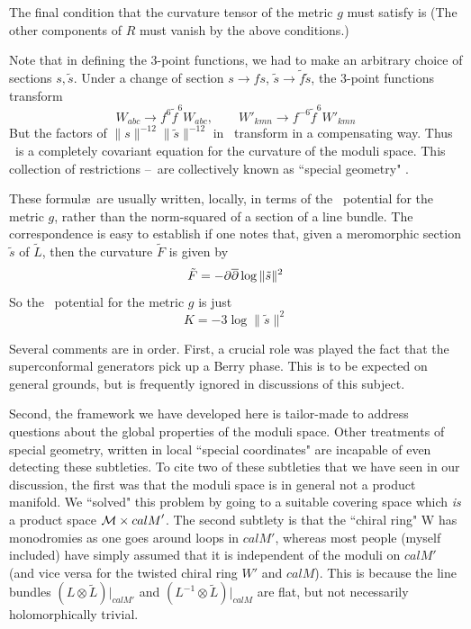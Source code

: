 The final condition that the curvature tensor of the metric $g$ must satisfy is
\eqn{}
(The other components of $R$ must vanish by the above conditions.)

Note that in defining the 3-point functions, we had to make an arbitrary choice
of sections $s,\tilde s$. Under a change of section $s\to f s$, $\tilde s\to
\tilde f\tilde s$, the 3-point functions  transform
$$W_{abc}\to f^6\tilde f^6 W_{abc},\qquad W'_{kmn}\to f^{-6}\tilde
f^6W'_{kmn}$$
But the factors of $\|s\|^{-12}\|\tilde s\|^{-12}$ in \Rspec\ transform in a
compensating way.
Thus  \Rspec\ is a completely covariant equation for the curvature
of the moduli space.  This collection of restrictions \Fspeca--\Rspec{}\ are
collectively known as ``special geometry"
.

These formul\ae\ are usually written, locally, in terms of the \Ka\ potential
for the metric $g$, rather than the norm-squared of a section of a line
bundle. The correspondence is easy to establish if one notes that, given a
meromorphic section $\tilde s$ of $\tilde L$, then the curvature $\tilde F$ is
given by
$$\tilde F=-\partial\overline{\partial} \log\|\tilde s\|^2$$
So the \Ka\ potential for the metric $g$ is just
$$K=-3\log\|\tilde s\|^2$$

Several comments are in order. First, a crucial role was played the fact
that the superconformal generators pick up a Berry phase. This is to be
expected on general grounds, but is frequently ignored in discussions of this
subject.

Second, the framework we have developed here is tailor-made to address
questions
about the global properties of the moduli space. Other treatments of special
geometry, written in local ``special coordinates" are incapable of even
detecting these subtleties. To cite two of these subtleties that we have seen
in our discussion, the first was that the moduli space is in general not a
product manifold. We ``solved" this
problem by going to a suitable covering space which {\it is} a product space
${\cal M}\times{cal M}'$. The second subtlety is that the ``chiral ring" W has
monodromies as one goes around loops in ${cal M}'$, whereas most people (myself
included)
have simply assumed that it is independent of the moduli on ${cal M}'$ (and vice
versa for the twisted chiral ring $W'$ and ${cal M}$). This is because the line
bundles $(L\otimes\tilde L)|_{{cal M}'}$ and $(L^{-1}\otimes\tilde L)|_{{cal M}}$ are
flat, but not necessarily holomorphically trivial.

